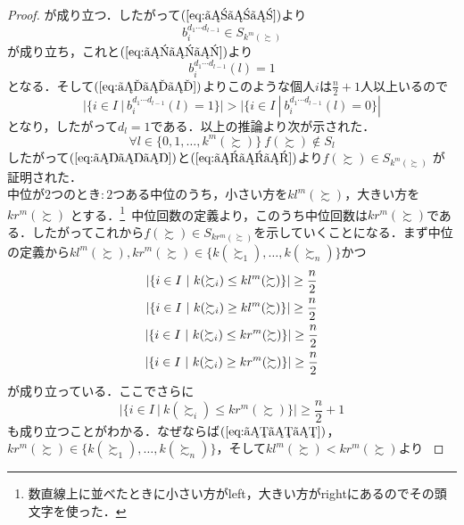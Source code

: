\documentclass[dvipdfmx]{jsarticle}
\begin{document}
\begin{proof}
  が成り立つ．したがって$(\ref{eq:けけけ})$より
  \begin{equation*}
    b_i^{d_1 \cdots d_{l-1}} \in S_{k^m(\succsim)}
  \end{equation*}
  が成り立ち，これと$(\ref{eq:かかか})$より
  \begin{equation*}
    b_i^{d_1 \cdots d_{l-1}}(l) = 1
  \end{equation*}
  となる．そして$(\ref{eq:いいい})$よりこのような個人$i$は$\frac{n}{2}+1$人以上いるので
  \begin{equation*}
    |\{i \in I \ | \ b_i^{d_1 \cdots d_{l-1}}(l) = 1 \}| >
    |\{i \in I \ | \ b_i^{d_1 \cdots d_{l-1}}(l) = 0 \}|
  \end{equation*}
  となり，したがって$d_l=1$である．以上の推論より次が示された．
  \begin{equation}\label{eq:くくく}
    \forall l \in \{0,1, \ldots, k^m(\succsim)\} \ f(\succsim) \notin S_l
  \end{equation}
  したがって$(\ref{eq:ききき})$と$(\ref{eq:くくく})$より$f(\succsim) \in S_{k^m(\succsim)}$
  が証明された．\\
  中位が$2$つのとき$\colon$$2$つある中位のうち，小さい方を$kl^m(\succsim)$，大きい方を$kr^m(\succsim)$
  とする．\<\footnote{数直線上に並べたときに小さい方がleft，大きい方がrightにあるのでその頭文字を使った．}\
  中位回数の定義より，このうち中位回数は$kr^m(\succsim)$である．したがってこれから$f(\succsim) \in
  S_{kr^m(\succsim)}$を示していくことになる．まず中位の定義から$kl^m(\succsim),kr^m(\succsim) \in
  \{k(\succsim_1),\ldots,k(\succsim_n)\}$かつ
  \begin{gather}
    |\{i \in I \ | \ k(\succsim_i) \leq kl^m(\succsim) \}| \geq \frac{n}{2} \notag \\
    |\{i \in I \ | \ k(\succsim_i) \geq kl^m(\succsim) \}| \geq \frac{n}{2} \label{eq:ててて} \\
    |\{i \in I \ | \ k(\succsim_i) \leq kr^m(\succsim) \}| \geq \frac{n}{2} \label{eq:さささ} \\
    |\{i \in I \ | \ k(\succsim_i) \geq kr^m(\succsim) \}| \geq \frac{n}{2} \notag
  \end{gather}
  が成り立っている．ここでさらに
  \begin{equation}\label{eq:ししし}
    |\{i \in I \ | \ k(\succsim_i) \leq kr^m(\succsim) \}| \geq \frac{n}{2}+1
  \end{equation}
  も成り立つことがわかる．なぜならば$(\ref{eq:さささ})$，$kr^m(\succsim) \in \{k(\succsim_1), \ldots,
  k(\succsim_n)\}$，そして$kl^m(\succsim) < kr^m(\succsim)$より
$$
\end{proof}
\end{document}
